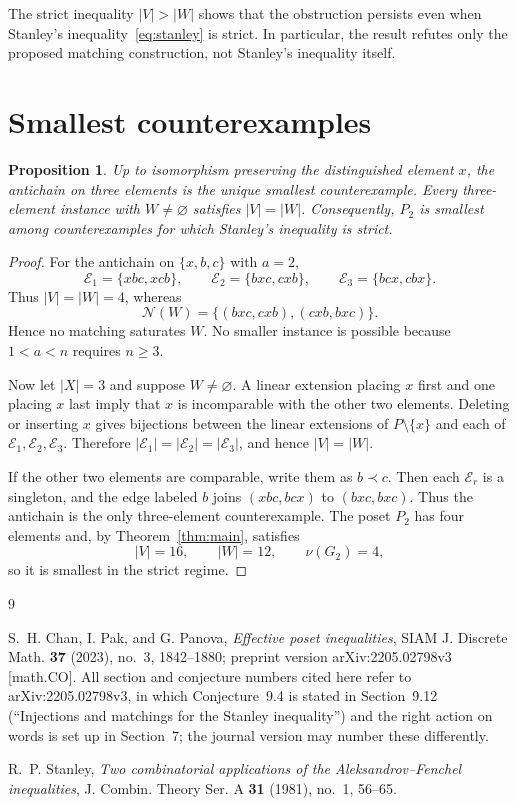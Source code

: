 \documentclass[11pt]{amsart}
\newtheorem{proposition}[theorem]{Proposition}
\newcommand{\cE}{\mathcal E}
\newcommand{\cN}{\mathcal N}
\begin{document}
The strict inequality $|V|>|W|$ shows that the obstruction persists even
when Stanley's inequality~\eqref{eq:stanley} is strict. In particular, the
result refutes only the proposed matching construction, not Stanley's
inequality itself.

\section{Smallest counterexamples}

\begin{proposition}\label{prop:minimal}
Up to isomorphism preserving the distinguished element $x$, the antichain on
three elements is the unique smallest counterexample. Every three-element
instance with $W\ne\varnothing$ satisfies $|V|=|W|$. Consequently, $P_2$ is
smallest among counterexamples for which Stanley's inequality is strict.
\end{proposition}

\begin{proof}
For the antichain on $\{x,b,c\}$ with $a=2$,
\[
 \cE_1=\{xbc,xcb\},\qquad
 \cE_2=\{bxc,cxb\},\qquad
 \cE_3=\{bcx,cbx\}.
\]
Thus $|V|=|W|=4$, whereas
\[
 \cN(W)=\{(bxc,cxb),(cxb,bxc)\}.
\]
Hence no matching saturates $W$. No smaller instance is possible because
$1<a<n$ requires $n\ge3$.

Now let $|X|=3$ and suppose $W\ne\varnothing$. A linear extension placing $x$
first and one placing $x$ last imply that $x$ is incomparable with the other
two elements. Deleting or inserting $x$ gives bijections between the linear
extensions of $P\setminus\{x\}$ and each of $\cE_1,\cE_2,\cE_3$. Therefore
$|\cE_1|=|\cE_2|=|\cE_3|$, and hence $|V|=|W|$.

If the other two elements are comparable, write them as $b\prec c$. Then each
$\cE_r$ is a singleton, and the edge labeled $b$ joins $(xbc,bcx)$ to
$(bxc,bxc)$. Thus the antichain is the only three-element counterexample.
The poset $P_2$ has four elements and, by Theorem~\ref{thm:main}, satisfies
\[
 |V|=16,\qquad |W|=12,\qquad \nu(G_2)=4,
\]
so it is smallest in the strict regime.
\end{proof}

\begin{thebibliography}{9}

S.~H. Chan, I. Pak, and G. Panova,
\emph{Effective poset inequalities},
SIAM J. Discrete Math. \textbf{37} (2023), no.~3, 1842--1880;
preprint version arXiv:2205.02798v3 [math.CO].
All section and conjecture numbers cited here refer to arXiv:2205.02798v3,
in which Conjecture~9.4 is stated in Section~9.12 (``Injections and matchings
for the Stanley inequality'') and the right action on words is set up in
Section~7; the journal version may number these differently.

R.~P. Stanley,
\emph{Two combinatorial applications of the Aleksandrov--Fenchel inequalities},
J. Combin. Theory Ser. A \textbf{31} (1981), no.~1, 56--65.

\end{thebibliography}
\end{document}
